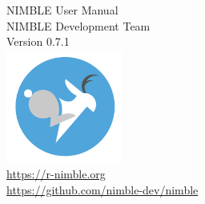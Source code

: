\thispagestyle{empty}
\begin{center}
{\huge NIMBLE User Manual}\\ 
\vspace{0.2in}
{\large NIMBLE Development Team}\\
\vspace{0.2in}
{\large Version 0.7.1}\\
\vspace{3in}
\includegraphics[width=1.5in]{../nimble-icon.png}\\
{\large
\href{https://r-nimble.org}{https://r-nimble.org}\\
\href{https://github.com/nimble-dev/nimble}{https://github.com/nimble-dev/nimble}
}
\end{center}

